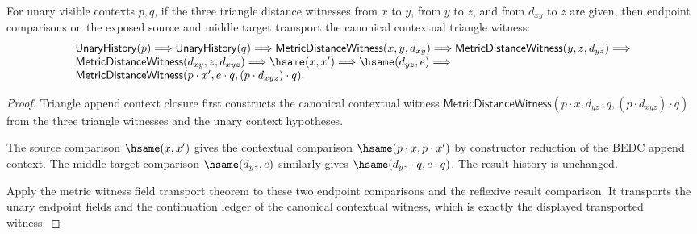 \begin{theorem}
\label{thm:metric-distance-witness-triangle-append-context-endpoint-transport}
For unary visible contexts $p,q$, if the three triangle distance witnesses
from $x$ to $y$, from $y$ to $z$, and from $d_{xy}$ to $z$ are given, then
endpoint comparisons on the exposed source and middle target transport the
canonical contextual triangle witness:
$$
\begin{array}{l}
\mathsf{UnaryHistory}(p)\Longrightarrow
\mathsf{UnaryHistory}(q)\Longrightarrow
\mathsf{MetricDistanceWitness}(x,y,d_{xy})\Longrightarrow
\mathsf{MetricDistanceWitness}(y,z,d_{yz})\Longrightarrow
\\
\mathsf{MetricDistanceWitness}(d_{xy},z,d_{xyz})\Longrightarrow
\hsame(x,x')\Longrightarrow
\hsame(d_{yz},e)\Longrightarrow
\\
\mathsf{MetricDistanceWitness}(p\cdot x',e\cdot q,(p\cdot d_{xyz})\cdot q).
\end{array}
$$
\end{theorem}
\begin{proof}
Triangle append context closure first constructs the canonical contextual
witness
$\mathsf{MetricDistanceWitness}(p\cdot x,d_{yz}\cdot q,(p\cdot d_{xyz})\cdot q)$
from the three triangle witnesses and the unary context hypotheses.

The source comparison $\hsame(x,x')$ gives the contextual comparison
$\hsame(p\cdot x,p\cdot x')$ by constructor reduction of the BEDC append
context. The middle-target comparison $\hsame(d_{yz},e)$ similarly gives
$\hsame(d_{yz}\cdot q,e\cdot q)$. The result history is unchanged.

Apply the metric witness field transport theorem to these two endpoint
comparisons and the reflexive result comparison. It transports the unary
endpoint fields and the continuation ledger of the canonical contextual
witness, which is exactly the displayed transported witness.
\end{proof}

